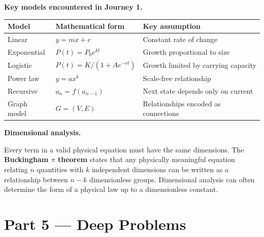 \documentclass[12pt, a4paper]{article}
\begin{document}
\begin{namebox}
\textbf{Key models encountered in Journey 1.}

\begin{center}
\renewcommand{\arraystretch}{1.4}
\begin{tabular}{l l l}
\toprule
\textbf{Model} & \textbf{Mathematical form} & \textbf{Key assumption} \\
\midrule
Linear & $y = mx + c$ & Constant rate of change \\
Exponential & $P(t) = P_0 e^{kt}$ & Growth proportional to size \\
Logistic & $P(t) = K/(1+Ae^{-rt})$ & Growth limited by carrying capacity \\
Power law & $y = ax^b$ & Scale-free relationship \\
Recursive & $a_n = f(a_{n-1})$ & Next state depends only on current \\
Graph model & $G = (V, E)$ & Relationships encoded as connections \\
\bottomrule
\end{tabular}
\end{center}
\end{namebox}

\begin{namebox}
\textbf{Dimensional analysis.}

Every term in a valid physical equation must have the same dimensions. The \textbf{Buckingham $\pi$ theorem} states that any physically meaningful equation relating $n$ quantities with $k$ independent dimensions can be written as a relationship between $n - k$ dimensionless groups. Dimensional analysis can often determine the form of a physical law up to a dimensionless constant.
\end{namebox}

\section{Part 5 \texorpdfstring{---}{--} Deep Problems}
\end{document}
